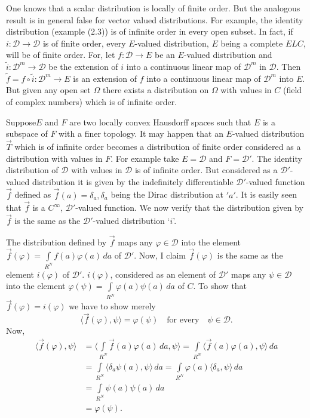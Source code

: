 One knows that a scalar distribution is locally of finite order. But
the analogous result is in general false for vector valued
distributions. For example, the identity distribution (example (2.3))%
is of infinite order in every open subset. In fact, if $i:\mathscr{D}
\to \mathscr{D}$ is of finite order, every $E$-valued distribution,
$E$ being a complete $ELC$, will be of finite order. For, let
$f:\mathscr{D} \to E$ be an $E$-valued distribution and
$\tilde{i}:\mathscr{D}^m \to \mathscr{D}$ be the extension of $i$ into
a continuous linear map of $\mathscr{D}^m$ in $\mathscr{D}$. Then
$\tilde{f}=f\circ\tilde{i}:\mathscr{D}^m \to E$ is an extension of $f$
into a continuous linear map of $\mathscr{D}^m$ into $E$. But given
any open set $\Omega$ there exists a distribution on $\Omega$ with
values in $C$ (field of complex numbers) which is of infinite order.

Suppose\pageoriginale $E$ and $F$ are two locally convex Hausdorff
spaces such that $E$ is a subspace of $F$ with a finer topology. It
may happen that an $E$-valued distribution $\overrightarrow{T}$ which
is of infinite order becomes a distribution of finite order considered
as a distribution with values in $F$. For example take $E=\mathscr{D}$
and $F=\mathscr{D}'$. The identity distribution of $\mathscr{D}$ with
values in $\mathscr{D}$ is of infinite order. But considered as a
$\mathscr{D}'$-valued distribution it is given by the indefinitely
differentiable $\mathscr{D}'$-valued function $\overrightarrow{f}$
defined as $\overrightarrow{f}(a)=\delta_a, \delta_a$ being the Dirac
distribution at $'a'$. It is easily seen that $\overrightarrow{f}$ is a
$C^\infty$, $\mathscr{D'}$-valued function. We now verify that the
distribution given by $\overrightarrow{f}$ is the same as the
$\mathscr{D'}$-valued distribution `$i$'.

The distribution defined by $\overrightarrow{f}$ maps any $\varphi
\in \mathscr{D}$ into the element
$\overrightarrow{f}(\varphi)=\int\limits_{R^N} f (a) \varphi (a)\,da$
of $\mathscr{D}'$. Now, I claim $\overrightarrow{f}(\varphi)$ is the
same as the element $i(\varphi)$ of $\mathscr{D}'$. $i(\varphi)$,
considered as an element of $\mathscr{D}'$ maps any $\psi \in
\mathscr{D}$ into the element $\varphi(\psi)= \int\limits_{R^N}
\varphi(a) \psi(a)\,da$ of $C$. To show that
$\overrightarrow{f}(\varphi) = i(\varphi)$ we have to show merely
$$
\langle \overrightarrow{f}(\varphi),\psi \rangle =
\varphi(\psi) \quad\text{for every} \quad \psi \in \mathscr{D}.
$$
Now,
\begin{align*}
\langle\overrightarrow{f}(\varphi),\psi \rangle &=
\langle\int\limits_{R^N} \overrightarrow{f}(a)\varphi(a)\,da, \psi \rangle =
\int\limits_{R^N} \langle \overrightarrow{f}(a)\varphi(a), \psi
\rangle\,da\\
& = \int\limits_{R^N} \langle \delta_a \psi(a), \psi \rangle\,da =
\int\limits_{R^N} \varphi(a)\langle\delta_a,\psi\rangle\,da\\
& = \int\limits_{R^N} \psi(a) \psi(a)\,da\\
& = \varphi(\psi).
\end{align*}


